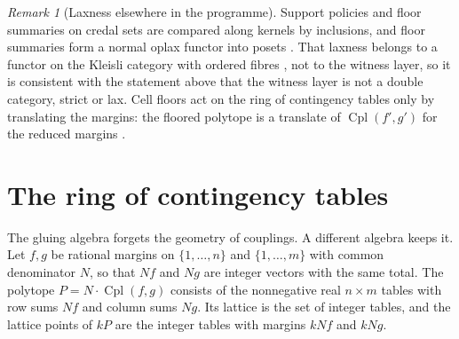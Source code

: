 \documentclass[11pt]{article}
\theoremstyle{definition}
\theoremstyle{remark}
\newtheorem{remark}[theorem]{Remark}
\newcommand{\Cpl}{\operatorname{Cpl}}
\begin{document}
\begin{remark}[Laxness elsewhere in the programme]
Support policies and floor summaries on credal sets are compared along kernels by inclusions, and floor summaries form a normal
oplax functor into posets \cite[Prop.~10.24]{Tower}. That laxness belongs to a functor on the Kleisli category with ordered fibres
\cite[Prop.~3.6]{Conditionals}, not to the witness layer, so it is consistent with the statement above that the witness layer is
not a double category, strict or lax. Cell floors act on the ring of contingency tables only by translating the margins: the
floored polytope is a translate of $\Cpl(f',g')$ for the reduced margins \cite[Prop.~6.9]{Conditionals}.
\end{remark}

\section{The ring of contingency tables}\label{sec:tables}

The gluing algebra forgets the geometry of couplings. A different algebra keeps it. Let $f,g$ be rational margins on
$\{1,\dots,n\}$ and $\{1,\dots,m\}$ with common denominator $N$, so that $Nf$ and $Ng$ are integer vectors with the same total.
The polytope $P=N\cdot\Cpl(f,g)$ consists of the nonnegative real $n\times m$ tables with row sums $Nf$ and column sums $Ng$.
Its lattice is the set of integer tables, and the lattice points of $kP$ are the integer tables with margins $kNf$ and
$kNg$.
\end{document}
